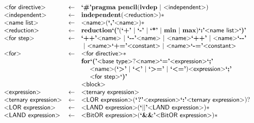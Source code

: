 \begin{figure}
  \ContinuedFloat
\[
\begin{array}{lcl}
  \pgrammar{for directive} & \gets & \plexer{\#} \pkeyword{pragma} ~ \pkeyword{pencil} (\pkeyword{ivdep} ~|~ \pgrammar{independent})\\

  \pgrammar{independent} & \gets & \pkeyword{independent} (\pgrammar{reduction})*\\

  \pgrammar{name list} & \gets & \pgrammar{name} (\plexer{,} \pgrammar{name})*\\
  \pgrammar{reduction} & \gets & \pkeyword{reduction} \plexer{(} (\plexer{+}~|~\plexer{-}~|~\plexer{*}~|~\pkeyword{min}~|~\pkeyword{max}) \plexer{:} \pgrammar{name list}\plexer{)}\\

  \pgrammar{for step} & \gets & \plexer{++} \pgrammar{name}
  ~|~ \plexer{{-}{-}} \pgrammar{name}
  ~|~ \pgrammar{name} \plexer{++}
  ~|~ \pgrammar{name} \plexer{{-}{-}}\\&&
  ~|~ \pgrammar{name} \plexer{{+}=} \pgrammar{constant}
  ~|~ \pgrammar{name} \plexer{{-}=} \pgrammar{constant}\\

  \pgrammar{for} & \gets & \pgrammar{for directive}*\\&& \pkeyword{for} \plexer{(}
  \pgrammar{base type}? \pgrammar{name} \plexer{=} \pgrammar{expression} \plexer{;}\\&&
    ~ ~ ~ ~\pgrammar{name} (\text{\plexer{\textgreater}}~|~\text{\plexer{\textless}}~|~\text{\plexer{\textgreater=}}~|~\text{\plexer{\textless=}}) \pgrammar{expression}\plexer{;}\\&&
    ~ ~ ~ ~\pgrammar{for step} \plexer{)}\\&&\pgrammar{block}\\

  \pgrammar{expression} & \gets & \pgrammar{ternary expression}\\

  \pgrammar{ternary expression} & \gets & \pgrammar{LOR expression}
  (\plexer{?} \pgrammar{expression} \plexer{:} \pgrammar{ternary expression})?\\

  \pgrammar{LOR expression} & \gets & \pgrammar{LAND expression} (\plexer{$||$} \pgrammar{LAND expression})*\\

  \pgrammar{LAND expression} & \gets & \pgrammar{BitOR expression} (\plexer{\&\&} \pgrammar{BitOR expression})*\\


\end{array}\]
\end{figure}
